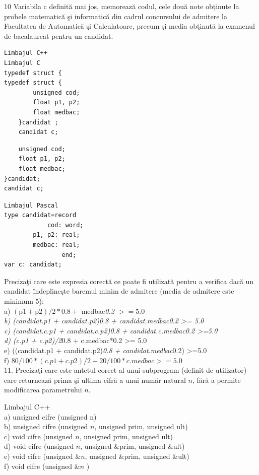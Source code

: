 \documentclass[10pt]{article}
\begin{document}
10 Variabila c definită mai jos, memorează codul, cele două note obținute la probele matematică şi informatică din cadrul concursului de admitere la Facultatea de Automatică şi Calculatoare, precum şi media obţinută la examenul de bacalaureat pentru un candidat.

\begin{verbatim}
Limbajul C++
Limbajul C
typedef struct {
typedef struct {
        unsigned cod;
        float p1, p2;
        float medbac;
    }candidat ;
    candidat c;
\end{verbatim}

\begin{verbatim}
    unsigned cod;
    float p1, p2;
    float medbac;
}candidat;
candidat c;
\end{verbatim}

\begin{verbatim}
Limbajul Pascal
type candidat=record
            cod: word;
        p1, p2: real;
        medbac: real;
                end;
var c: candidat;
\end{verbatim}

Precizaţi care este expresia corectă ce poate fi utilizată pentru a verifica dacă un candidat îndeplineşte baremul minim de admitere (media de admitere este minimum 5):\\
a) $(\mathrm{p} 1+\mathrm{p} 2) / 2 * 0.8+$ medbac\textit{0.2 $>=5.0$\\
b) (candidat.p1 + candidat.p2)\textit{0.8 + candidat.medbac}0.2 >= 5.0\\
c) (candidat.c.p1 + candidat.c.p2)\textit{0.8 + candidat.c.medbac}0.2 >=5.0\\
d) (c.p1 + c.p2)/2}0.8 + c.medbac*0.2 >= 5.0\\
e) ((candidat.p1 + candidat.p2)\textit{0.8 + candidat.medbac}0.2) >=5.0\\
f) $80 / 100 *(c . p 1+c . p 2) / 2+20 / 100 * c . m e d b a c>=5.0$\\
11. Precizaţi care este antetul corect al unui subprogram (definit de utilizator) care returnează prima şi ultima cifră a unui număr natural $n$, fără a permite modificarea parametrului $n$.

Limbajul C++\\
a) unsigned cifre (unsigned n)\\
b) unsigned cifre (unsigned $n$, unsigned prim, unsigned ult)\\
c) void cifre (unsigned $n$, unsigned prim, unsigned ult)\\
d) void cifre (unsigned $n$, unsigned \&prim, unsigned \&ult)\\
e) void cifre (unsigned $\& n$, unsigned \&prim, unsigned \&ult)\\
f) void cifre (unsigned $\& n$ )
\end{document}
